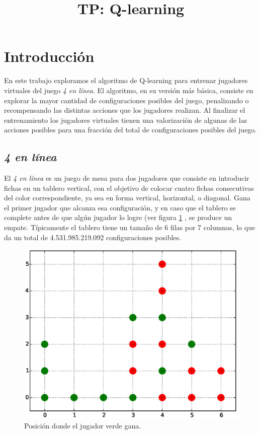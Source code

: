 \documentclass[11pt, spanish]{article}
\title{TP: Q-learning}
\begin{document}
\maketitle

\section{Introducción}
\par En este trabajo exploramos el algoritmo de Q-learning para entrenar 
jugadores virtuales del juego \emph{4 en línea}. El algoritmo, en su versión 
más básica, consiste en explorar la mayor cantidad de configuraciones 
posibles del juego, penalizando o recompensando las distintas acciones 
que los jugadores realizan. Al finalizar el 
entrenamiento los jugadores virtuales tienen una valorización de algunas de las 
acciones posibles para una fracción del total de configuraciones posibles del 
juego. 

\subsection{\emph{4 en línea}}

\par El \emph{4 en línea} es un juego de mesa para dos jugadores que consiste 
en introducir fichas en un tablero vertical, con el objetivo de colocar cuatro 
fichas consecutivas del color correspondiente, ya sea en forma vertical, 
horizontal, o diagonal. Gana el primer jugador que alcanza esa configuración, y 
en caso que el tablero se complete antes de que algún jugador lo logre 
(ver figura \ref{fig:tablero} , se produce un empate. 
Típicamente el tablero tiene un tamaño de 6 filas por 7 columnas, lo que da un 
total de 4.531.985.219.092 configuraciones posibles.
\begin{figure}
\centering
\includegraphics[scale = 0.5]{figuras/Tablero.eps}
\caption{Posición donde el jugador verde gana.}
\label{fig:tablero}
\end{figure}
\end{document}
